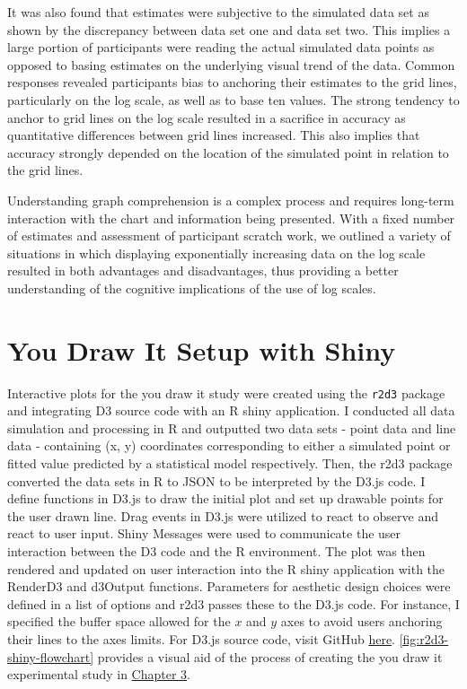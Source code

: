 \documentclass[print]{nuthesis}
\begin{document}
It was also found that estimates were subjective to the simulated data set as shown by the discrepancy between data set one and data set two.
This implies a large portion of participants were reading the actual simulated data points as opposed to basing estimates on the underlying visual trend of the data.
Common responses revealed participants bias to anchoring their estimates to the grid lines, particularly on the log scale, as well as to base ten values.
The strong tendency to anchor to grid lines on the log scale resulted in a sacrifice in accuracy as quantitative differences between grid lines increased.
This also implies that accuracy strongly depended on the location of the simulated point in relation to the grid lines.

Understanding graph comprehension is a complex process and requires long-term interaction with the chart and information being presented.
With a fixed number of estimates and assessment of participant scratch work, we outlined a variety of situations in which displaying exponentially increasing data on the log scale resulted in both advantages and disadvantages, thus providing a better understanding of the cognitive implications of the use of log scales.

\appendix

\hypertarget{youdrawit-with-shiny}{%
\chapter{You Draw It Setup with Shiny}\label{youdrawit-with-shiny}}

Interactive plots for the you draw it study were created using the \texttt{r2d3} package and integrating D3 source code with an R shiny application.
I conducted all data simulation and processing in R and outputted two data sets - point data and line data - containing (x, y) coordinates corresponding to either a simulated point or fitted value predicted by a statistical model respectively.
Then, the r2d3 package converted the data sets in R to JSON to be interpreted by the D3.js code.
I define functions in D3.js to draw the initial plot and set up drawable points for the user drawn line.
Drag events in D3.js were utilized to react to observe and react to user input.
Shiny Messages were used to communicate the user interaction between the D3 code and the R environment.
The plot was then rendered and updated on user interaction into the R shiny application with the RenderD3 and d3Output functions.
Parameters for aesthetic design choices were defined in a list of options and r2d3 passes these to the D3.js code.
For instance, I specified the buffer space allowed for the \(x\) and \(y\) axes to avoid users anchoring their lines to the axes limits. For D3.js source code, visit GitHub \href{https://github.com/srvanderplas/Perception-of-Log-Scales/blob/master/you-draw-it-development/you-draw-it-test-app/main.js}{here}.
\cref{fig:r2d3-shiny-flowchart} provides a visual aid of the process of creating the you draw it experimental study in \protect\hyperlink{youdrawit}{Chapter 3}.
\end{document}
